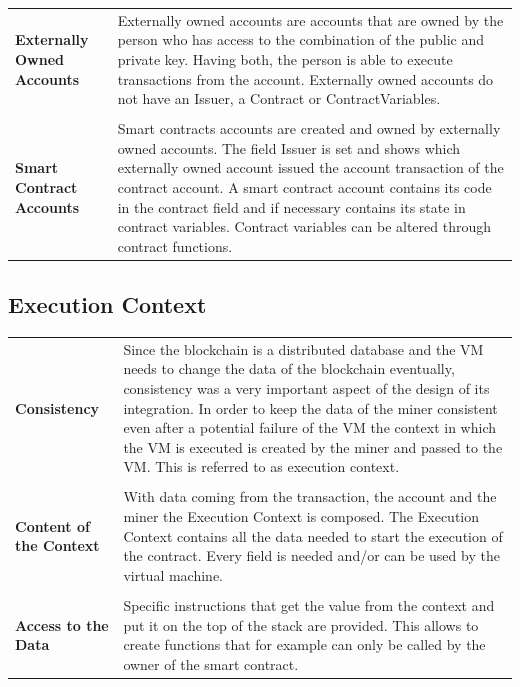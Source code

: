 \begin{tabular}[t]{ p{3cm} p{12.5cm}}
\raggedright
\textbf{Externally Owned Accounts} &
Externally owned accounts are accounts that are owned by the person who has access to the combination of the public and private key. Having both, the person is able to execute transactions from the account. Externally owned accounts do not have an Issuer, a Contract or ContractVariables. \\ \\
\textbf{Smart Contract Accounts} &
Smart contracts accounts are created and owned by externally owned accounts. The field Issuer is set and shows which externally owned account issued the account transaction of the contract account. A smart contract account contains its code in the contract field and if necessary contains its state in contract variables. Contract variables can be altered through contract functions.
\end{tabular}

\subsection{Execution Context}
\begin{tabular}[t]{ p{3cm} p{12.5cm}}
\raggedright
\textbf{Consistency} &
Since the blockchain is a distributed database and the VM needs to change the data of the blockchain eventually, consistency was a very important aspect of the design of its integration. In order to keep the data of the miner consistent even after a potential failure of the VM the context in which the VM is executed is created by the miner and passed to the VM. This is referred to as execution context. \\ \\ %

\raggedright
\textbf{Content of the Context} &
With data coming from the transaction, the account and the miner the Execution Context is composed. The Execution Context contains all the data needed to start the execution of the contract. Every field is needed and/or can be used by the virtual machine.  \\ \\ 

\raggedright
\textbf{Access to the Data} &
Specific instructions that get the value from the context and put it on the top of the stack are provided. This allows to create functions that for example can only be called by the owner of the smart contract. 
\end{tabular}

